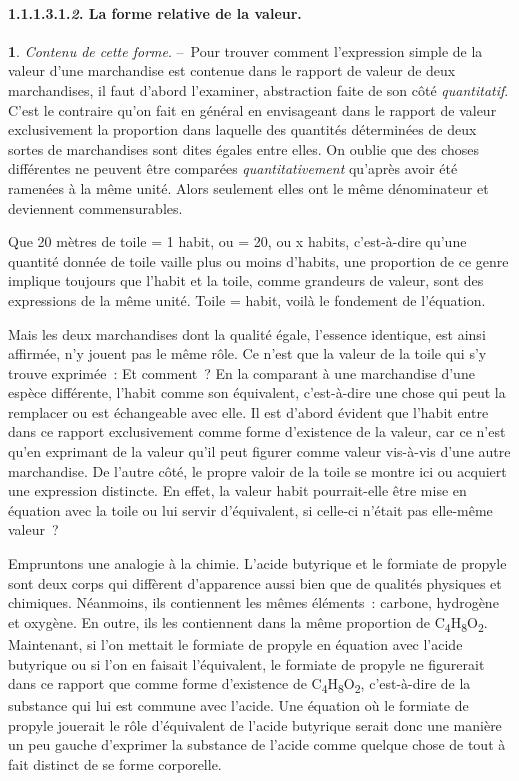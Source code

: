 \documentclass[french,twoside]{book} %
\begin{document}
\paragraph[{1.1.1.3.1.2. La forme relative de la valeur.}]{1.1.1.3.1.\textbf{\emph{2}}. La forme relative de la valeur.}
\noindent \textbf{1}. \emph{Contenu de cette forme}. – Pour trouver comment l’expression simple de la valeur d’une marchandise est contenue dans le rapport de valeur de deux marchandises, il faut d’abord l’examiner, abstraction faite de son côté \emph{quantitatif}. C’est le contraire qu’on fait en général en envisageant dans le rapport de valeur exclusivement la proportion dans laquelle des quantités déterminées de deux sortes de marchandises sont dites égales entre elles. On oublie que des choses différentes ne peuvent être comparées \emph{quantitativement} qu’après avoir été ramenées à la même unité. Alors seulement elles ont le même dénominateur et deviennent commensurables.\par
Que 20 mètres de toile = 1 habit, ou = 20, ou x habits, c’est-à-dire qu’une quantité donnée de toile vaille plus ou moins d’habits, une proportion de ce genre implique toujours que l’habit et la toile, comme grandeurs de valeur, sont des expressions de la même unité. Toile = habit, voilà le fondement de l’équation.\par
Mais les deux marchandises dont la qualité égale, l’essence identique, est ainsi affirmée, n’y jouent pas le même rôle. Ce n’est que la valeur de la toile qui s’y trouve exprimée : Et comment ? En la comparant à une marchandise d’une espèce différente, l’habit comme son équivalent, c’est-à-dire une chose qui peut la remplacer ou est échangeable avec elle. Il est d’abord évident que l’habit entre dans ce rapport exclusivement comme forme d’existence de la valeur, car ce n’est qu’en exprimant de la valeur qu’il peut figurer comme valeur vis-à-vis d’une autre marchandise. De l’autre côté, le propre valoir de la toile se montre ici ou acquiert une expression distincte. En effet, la valeur habit pourrait-elle être mise en équation avec la toile ou lui servir d’équivalent, si celle-ci n’était pas elle-même valeur ?\par
Empruntons une analogie à la chimie. L’acide butyrique et le formiate de propyle sont deux corps qui diffèrent d’apparence aussi bien que de qualités physiques et chimiques. Néanmoins, ils contiennent les mêmes éléments : carbone, hydrogène et oxygène. En outre, ils les contiennent dans la même proportion de C\textsubscript{4}H\textsubscript{8}O\textsubscript{2}. Maintenant, si l’on mettait le formiate de propyle en équation avec l’acide butyrique ou si l’on en faisait l’équivalent, le formiate de propyle ne figurerait dans ce rapport que comme forme d’existence de C\textsubscript{4}H\textsubscript{8}O\textsubscript{2}, c’est-à-dire de la substance qui lui est commune avec l’acide. Une équation où le formiate de propyle jouerait le rôle d’équivalent de l’acide butyrique serait donc une manière un peu gauche d’exprimer la substance de l’acide comme quelque chose de tout à fait distinct de se forme corporelle.\par
\end{document}
